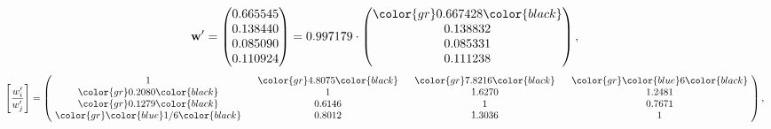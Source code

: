 \begin{example}
\begin{equation*}
\mathbf{w}^{\prime} =
\begin{pmatrix}
0.665545\\
0.138440\\
0.085090\\
0.110924
\end{pmatrix} =
0.997179\cdot
\begin{pmatrix}
\color{gr} 0.667428\color{black} \\
0.138832\\
0.085331\\
0.111238
\end{pmatrix},
\end{equation*}
\begin{equation*}
\left[ \frac{{w}^{\prime}_i}{{w}^{\prime}_j} \right] =
\begin{pmatrix}
$\,\,$ 1 $\,\,$ & $\,\,$\color{gr} 4.8075\color{black} $\,\,$ & $\,\,$\color{gr} 7.8216\color{black} $\,\,$ & $\,\,$\color{gr} \color{blue} 6\color{black} $\,\,$ \\
$\,\,$\color{gr} 0.2080\color{black} $\,\,$ & $\,\,$ 1 $\,\,$ & $\,\,$1.6270$\,\,$ & $\,\,$1.2481  $\,\,$ \\
$\,\,$\color{gr} 0.1279\color{black} $\,\,$ & $\,\,$0.6146$\,\,$ & $\,\,$ 1 $\,\,$ & $\,\,$0.7671 $\,\,$ \\
$\,\,$\color{gr} \color{blue}  1/6\color{black} $\,\,$ & $\,\,$0.8012$\,\,$ & $\,\,$1.3036$\,\,$ & $\,\,$ 1  $\,\,$ \\
\end{pmatrix},
\end{equation*}
\end{example}
\newpage
